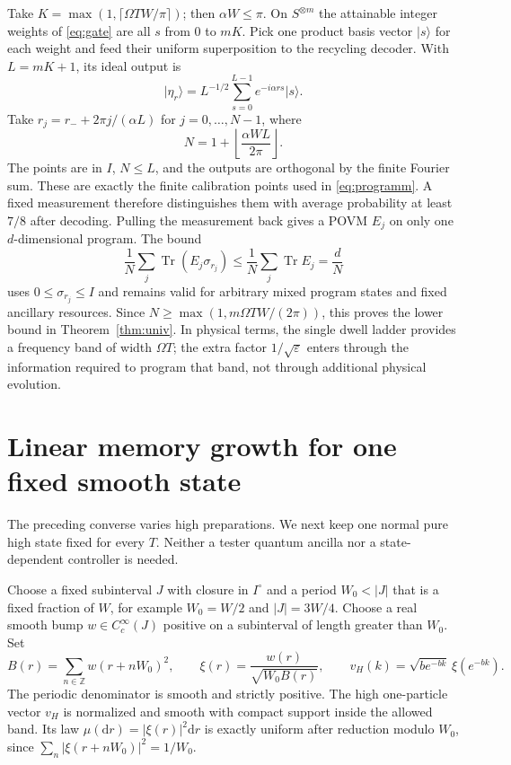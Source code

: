 \documentclass[11pt]{article}
\theoremstyle{remark}
\newcommand{\tr}{\operatorname{Tr}}
\newcommand{\dd}{\mathrm{d}}
\newcommand{\ket}[1]{\lvert #1\rangle}
\begin{document}
Take \(K=\max(1,\lceil\Omega T W/\pi\rceil)\); then
\(\alpha W\le\pi\). On \(S^{\otimes m}\) the attainable integer
weights of \eqref{eq:gate} are all \(s\) from \(0\) to \(mK\).
Pick one product basis vector \(\ket s\) for each weight and feed
their uniform superposition to the recycling decoder.
With \(L=mK+1\), its ideal output is
\[
 \ket{\eta_r}=L^{-1/2}\sum_{s=0}^{L-1}e^{-i\alpha rs}\ket s .
\]
Take \(r_j=r_-+2\pi j/(\alpha L)\) for
\(j=0,\ldots,N-1\), where
\begin{equation}\label{eq:N}
 N=1+\left\lfloor \frac{\alpha WL}{2\pi}\right\rfloor.
\end{equation}
The points are in \(I\), \(N\le L\), and the outputs are orthogonal
by the finite Fourier sum. These are exactly the finite
calibration points used in \eqref{eq:programm}. A fixed
measurement therefore distinguishes them with average probability
at least \(7/8\) after decoding. Pulling the measurement back gives
a POVM \(E_j\) on only one \(d\)-dimensional program. The bound
\[
 \frac1N\sum_j\tr(E_j\sigma_{r_j})
      \le \frac1N\sum_j\tr E_j=\frac dN
\]
uses \(0\le\sigma_{r_j}\le I\) and remains valid for arbitrary
mixed program states and fixed ancillary resources. Since
\(N\ge\max(1,m\Omega TW/(2\pi))\), this proves the lower bound in
Theorem~\ref{thm:univ}. In physical terms, the single dwell ladder
provides a frequency band of width \(\Omega T\); the extra factor
\(1/\sqrt\varepsilon\) enters through the information required to
program that band, not through additional physical evolution.

\section{Linear memory growth for one fixed smooth state}\label{sec:fixed}

The preceding converse varies high preparations. We next keep one
normal pure high state fixed for every \(T\). Neither a tester
quantum ancilla nor a state-dependent controller is needed.

Choose a fixed subinterval \(J\) with closure in \(I^\circ\) and
a period \(W_0< |J|\) that is a fixed fraction of \(W\), for example
\(W_0=W/2\) and \(|J|=3W/4\). Choose a real smooth bump
\(w\in C_c^\infty(J)\) positive on a subinterval of length greater
than \(W_0\). Set
\begin{equation}\label{eq:wrapped}
 B(r)=\sum_{n\in\mathbb Z}w(r+nW_0)^2,\qquad
 \xi(r)=\frac{w(r)}{\sqrt{W_0B(r)}},\qquad
 v_H(k)=\sqrt{be^{-bk}}\,\xi(e^{-bk}).
\end{equation}
The periodic denominator is smooth and strictly positive.
The high one-particle vector \(v_H\) is normalized and smooth with
compact support inside the allowed band. Its law
\(\mu(\dd r)=|\xi(r)|^2\dd r\) is exactly uniform after reduction
modulo \(W_0\), since \(\sum_n|\xi(r+nW_0)|^2=1/W_0\).
\end{document}
